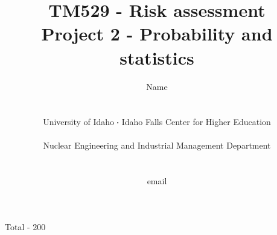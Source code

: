 \documentclass[11pt,a4paper]{article}
\newcommand*\sq{\mathbin{\vcenter{\hbox{\rule{.3ex}{.3ex}}}}} %
\begin{document}
\begin{titlepage}
    \title{
        TM529 - Risk assessment\\
        Project 2 - Probability and statistics\\
    }
    \author{
        Name
        \\ \\ \\
        University of Idaho $\sq$ Idaho Falls Center for Higher Education
        \\ \\
        Nuclear Engineering and Industrial Management Department
        \\ \\ \\
        email 
    }
\clearpage %
\maketitle
\vspace*{\fill}
\begin{flushright}{
        Total - 200
}
\end{flushright}
\thispagestyle{empty} %
\end{titlepage}
\end{document}

